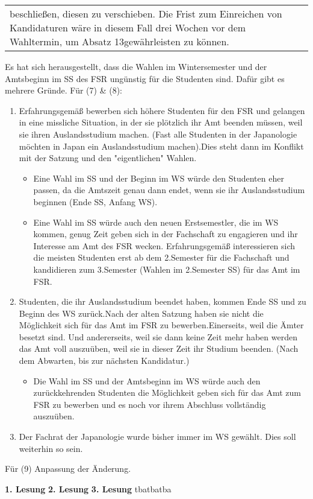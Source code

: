 {\begin{longtable}{|p{7.5cm}|p{7.5cm}|}
        beschließen, diesen zu verschieben. Die Frist zum Einreichen von Kandidaturen wäre in diesem Fall drei Wochen vor dem
        Wahltermin, um Absatz 13gewährleisten zu können.\\
    \end{longtable}
    }{
        Es hat sich herausgestellt, dass die Wahlen im Wintersemester und der Amtsbeginn im SS des FSR ungünstig für die Studenten
        sind. Dafür gibt es mehrere Gründe.\newline
        Für (7) \& (8):
        \begin{enumerate}
            \item Erfahrungsgemäß bewerben sich höhere Studenten für den FSR und gelangen in eine missliche Situation,
            in der sie plötzlich ihr Amt beenden müssen, weil sie ihren Auslandsstudium machen. (Fast alle Studenten in der
            Japanologie möchten in Japan ein Auslandsstudium machen).Dies steht dann im Konflikt mit der Satzung und den 
            "eigentlichen" Wahlen.
            \begin{itemize}
                \item Eine Wahl im SS und der Beginn im WS würde den Studenten eher passen, da die Amtszeit genau dann endet, wenn sie ihr Auslandsstudium beginnen (Ende SS, Anfang WS).
                \item Eine Wahl im SS würde auch den neuen Erstsemestler, die im WS kommen, genug Zeit geben sich in der Fachschaft zu engagieren und ihr Interesse am Amt des FSR wecken. Erfahrungsgemäß interessieren sich die meisten Studenten erst ab dem 2.Semester für die Fachschaft und kandidieren zum 3.Semester (Wahlen im 2.Semester SS) für das Amt im FSR.
            \end{itemize}
            \item Studenten, die ihr Auslandsstudium beendet haben, kommen Ende SS und zu Beginn des WS zurück.Nach der alten Satzung haben sie nicht die Möglichkeit sich für das Amt im FSR zu bewerben.Einerseits, weil die Ämter besetzt sind. Und andererseits, weil sie dann keine Zeit mehr haben werden das Amt voll auszuüben, weil sie in dieser Zeit ihr Studium beenden. (Nach dem Abwarten, bis zur nächsten Kandidatur.)
            \begin{itemize}
                \item Die Wahl im SS und der Amtsbeginn im WS würde auch den zurückkehrenden Studenten die Möglichkeit geben sich für das Amt zum FSR zu bewerben und es noch vor ihrem Abschluss vollständig auszuüben.
            \end{itemize}
            \item Der Fachrat der Japanologie wurde bisher immer im WS gewählt. Dies soll weiterhin so sein.
        \end{enumerate}
        Für (9) Anpassung der Änderung.
    }{
        \textbf{1. Lesung}
        \ul{}
        \textbf{2. Lesung}
        \ul{}
        \textbf{3. Lesung}
        \ul{}
    }{tba}{tba}{tba}

